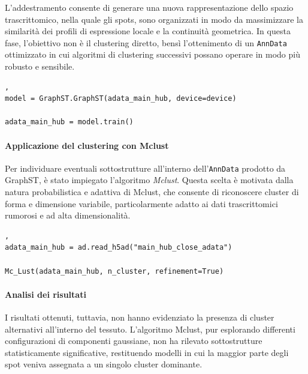 L'addestramento consente di generare una nuova rappresentazione 
dello spazio trascrittomico, nella quale gli spots, sono organizzati 
in modo da massimizzare la similarità dei profili di espressione locale e la continuità
geometrica.  
In questa fase, l'obiettivo non è il clustering diretto, bensì l'ottenimento 
di un \texttt{AnnData} ottimizzato in cui
algoritmi di clustering successivi possano operare in modo più robusto e 
sensibile.

\begin{lstlisting}[style=mypython,
                   label=code:NN,
                   caption={Addestramento modello con GraphST},
                   basicstyle=\ttfamily\scriptsize],
model = GraphST.GraphST(adata_main_hub, device=device)

adata_main_hub = model.train()
\end{lstlisting}

\paragraph{Applicazione del clustering con Mclust\\}
Per individuare eventuali sottostrutture all'interno dell'\texttt{AnnData} prodotto 
da GraphST, è stato impiegato l'algoritmo \textit{Mclust}. 
Questa scelta è motivata dalla natura probabilistica e adattiva di Mclust, 
che consente di riconoscere cluster di forma e dimensione variabile, 
particolarmente adatto ai dati trascrittomici rumorosi e ad alta dimensionalità.
\begin{lstlisting}[style=mypython,
                   label=code:NN,
                   caption={Applicazione algoritmo Mclust},
                   basicstyle=\ttfamily\scriptsize],
adata_main_hub = ad.read_h5ad("main_hub_close_adata")

Mc_Lust(adata_main_hub, n_cluster, refinement=True)
\end{lstlisting}

\paragraph{Analisi dei risultati\\}
I risultati ottenuti, tuttavia, non hanno evidenziato la presenza di cluster alternativi 
all'interno del tessuto.  
L'algoritmo Mclust, pur esplorando differenti configurazioni di componenti gaussiane, 
non ha rilevato sottostrutture statisticamente significative, 
restituendo modelli in cui la maggior parte degli spot veniva assegnata
a un singolo cluster dominante.

